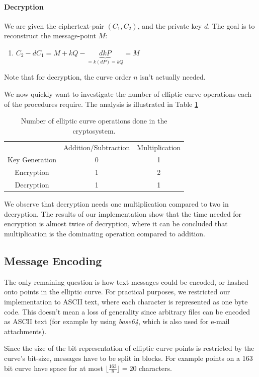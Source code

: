 \documentclass[11pt,english]{article}
\begin{document}
\paragraph{Decryption}
We are given the ciphertext-pair $(C_1,C_2)$, and the private key $d$. The goal is to reconstruct the message-point $M$:
\begin{enumerate}
\item $C_2-dC_1=M+kQ-\underbrace{dkP}_{=k(dP)=kQ}=M$
\end{enumerate}
Note that for decryption, the curve order $n$ isn't actually needed. 

We now quickly want to investigate the number of elliptic curve operations each of the procedures require. The analysis is illustrated in Table \ref{elgoperations}

\begin{table}
\centering
\begin{tabular}{c|c|c}
 & Addition/Subtraction & Multiplication \\ \cline{1-3}
Key Generation & 0 & 1 \\ 
Encryption & 1 & 2 \\ 
Decryption & 1 & 1
\end{tabular}
\caption{Number of elliptic curve operations done in the cryptosystem.}
\label{elgoperations}
\end{table}
We observe that decryption needs one multiplication compared to two in decryption. The results of our implementation show that the time needed for encryption is almost twice of decryption, where it can be concluded that multiplication is the dominating operation compared to addition.

\subsection{Message Encoding}
\label{Message Encoding}
The only remaining question is how text messages could be encoded, or hashed onto points in the elliptic curve. For practical purposes, we restricted our implementation to ASCII text, where each character is represented as one byte code. This doesn't mean a loss of generality since arbitrary files can be encoded as ASCII text (for example by using \emph{base64}, which is also used for e-mail attachments).

Since the size of the bit representation of elliptic curve points is restricted by the curve's bit-size, messages have to be split in blocks. For example points on a 163 bit curve have space for at most $\lfloor\frac{163}{8}\rfloor=20$ characters.
\end{document}
